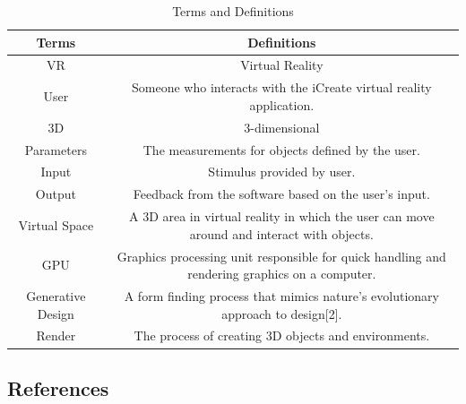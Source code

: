 \documentclass[letterpaper,draftclsnofoot,onecolumn,10 pt,compsoc]{IEEEtran}
\begin{document}
\begin{table}[!hbt]
		\begin{center}
		\caption{Terms and Definitions}
		\label{tab:simParameters}
		\begin{tabular}{|c|c|}
			\hline
			Terms & Definitions\\
            \hline
            VR & Virtual Reality \\
			\hline
			User & Someone who interacts with the iCreate virtual reality application.\\
			\hline
			3D & 3-dimensional\\
			\hline
			Parameters & The measurements for objects defined by the user.\\
			\hline
            Input & Stimulus provided by user.\\
            \hline
            Output & Feedback from the software based on the user’s input.\\
            \hline
            Virtual Space & A 3D area in virtual reality in which the user can move around  and interact with 			  objects.\\
            \hline
            GPU & Graphics processing unit responsible for quick handling and rendering graphics on a 					computer.\\
            \hline
            Generative Design & A form finding process that mimics nature’s evolutionary approach to 					design[2].\\
            \hline
            Render & The process of creating 3D objects and environments.\\
            
            
			\hline
		\end{tabular}
		\end{center}
	\end{table}
    
    
\subsection{References}   
\end{document}
